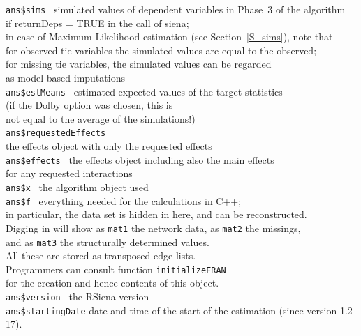 \documentclass[a4paper,fleqn,11pt]{article}
\newcommand{\+}{\, + \,}
\begin{document}
\begin{tabbing}
 \texttt{ans\$sims }         \> simulated values of dependent variables
                                      in Phase~3 of the algorithm     \\
                             \>  if \textsf{returnDeps = TRUE}
                                        in the call of \textsf{siena}; \\
                             \> in case of Maximum Likelihood estimation (see Section~\ref{S_sims}), note that \\
                             \> for observed tie variables the simulated values are
                             equal to the observed; \\
                             \> for missing tie variables, the simulated values can be regarded \\
                             \> as model-based imputations \\
 \texttt{ans\$estMeans }     \> estimated expected values of the target statistics\\
                             \> (if the Dolby option was chosen, this is \\
                             \> not equal to the average of the simulations!)\\
 \texttt{ans\$requestedEffects }  \\
                            \> the effects object with only the requested effects\\
 \texttt{ans\$effects }      \> the effects object including also the main effects\\
                                \> for any requested interactions\\
 \texttt{ans\$x }            \> the algorithm object used\\
 \texttt{ans\$f }            \> everything needed for the calculations in C++;\\
                             \> in particular, the data set is hidden in here,
                                and can be reconstructed.\\
                             \> Digging in will show as \texttt{mat1} the network data,
                                 as \texttt{mat2} the missings, \\
                             \>   and as \texttt{mat3} the structurally determined values.\\
                             \> All these are stored as transposed edge lists.\\
                             \> Programmers can consult function \texttt{initializeFRAN}\\
                             \> for the creation and hence contents of this object.\\
 \texttt{ans\$version }      \> the \textsf{RSiena} version\\
 \texttt{ans\$startingDate}  \> date and time of the start of the estimation (since version 1.2-17).\\

\end{tabbing}
\end{document}
